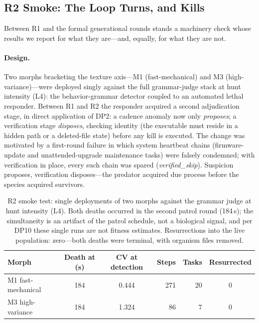 \documentclass[11pt,a4paper]{article}
\begin{document}
\subsection{R2 Smoke: The Loop Turns, and Kills}
\label{sec:r2smoke}

Between R1 and the formal generational rounds stands a machinery check whose results we report for what they are---and, equally, for what they are not.

\paragraph{Design.} Two morphs bracketing the texture axis---M1 (fast-mechanical) and M3 (high-variance)---were deployed singly against the full grammar-judge stack at hunt intensity (L4): the behavior-grammar detector coupled to an automated lethal responder. Between R1 and R2 the responder acquired a second adjudication stage, in direct application of DP2: a cadence anomaly now only \emph{proposes}; a verification stage \emph{disposes}, checking identity (the executable must reside in a hidden path or a deleted-file state) before any kill is executed. The change was motivated by a first-round failure in which system heartbeat chains (firmware-update and unattended-upgrade maintenance tasks) were falsely condemned; with verification in place, every such chain was spared (\emph{verified\_skip}). Suspicion proposes, verification disposes---the predator acquired due process before the species acquired survivors.

\begin{table}[t]
\centering\small
\caption{R2 smoke test: single deployments of two morphs against the grammar judge at hunt intensity (L4). Both deaths occurred in the second patrol round (184\,s); the simultaneity is an artifact of the patrol schedule, not a biological signal, and per DP10 these single runs are not fitness estimates. Resurrections into the live population: zero---both deaths were terminal, with organism files removed.}
\label{tab:r2smoke}
\begin{tabular}{@{}l cc rr c@{}}
\toprule
Morph & Death at (s) & CV at detection & Steps & Tasks & Resurrected \\
\midrule
M1 fast-mechanical & 184 & 0.444 & 271 & 20 & 0 \\
M3 high-variance & 184 & 1.324 & 86 & 7 & 0 \\
\bottomrule
\end{tabular}
\end{table}
\end{document}
